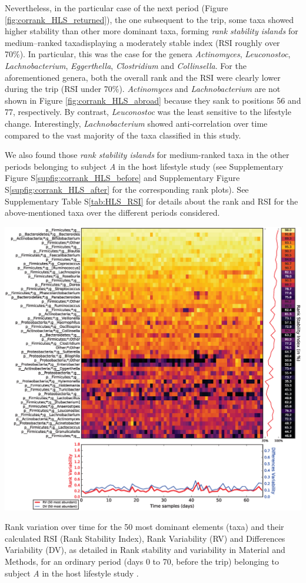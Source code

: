 Nevertheless, in the particular case of the next period (Figure \ref{fig:corrank_HLS_returned}), the one subsequent to the trip, some taxa showed higher stability than other more dominant taxa, forming \emph{rank stability islands} for medium--ranked taxadisplaying a moderately stable index (RSI roughly over 70\%). In particular, this was the case for the genera \emph{Actinomyces}, \emph{Leuconostoc}, \emph{Lachnobacterium}, \emph{Eggerthella}, \emph{Clostridium} and	\emph{Collinsella}. For the aforementioned genera, both the overall rank and the RSI were clearly lower during the trip (RSI under 70\%). \emph{Actinomyces} and \emph{Lachnobacterium} are not shown in Figure \ref{fig:corrank_HLS_abroad} because they sank to positions 56 and 77, respectively. By contrast, \emph{Leuconostoc} was the least sensitive to the lifestyle change. Interestingly, \emph{Lachnobacterium} showed anti-correlation over time compared to the vast majority of the taxa classified in this study.

We also found those \emph{rank stability islands} for medium-ranked taxa in the other periods belonging to subject \emph{A} in the host lifestyle study \cite{hostlife} (see Supplementary Figure S\ref{supfig:corrank_HLS_before} and Supplementary Figure S\ref{supfig:corrank_HLS_after} for the corresponding rank plots). See Supplementary Table S\ref{tab:HLS_RSI} for details about the rank and RSI for the above-mentioned taxa over the different periods considered.

\begin{supfig}
	\centering
	\includegraphics[width=1.0\textwidth]{figs/supfig_corrank_HLS_StoolA_before.eps}
	\caption{Rank variation over time for the 50 most dominant elements (taxa) and their calculated RSI (Rank Stability Index), Rank Variability (RV) and Differences Variability (DV), as detailed in Rank stability and variability in Material and Methods, for an ordinary period (days 0 to 70, before the trip) belonging to subject \emph{A} in the host lifestyle study \cite{hostlife}.}
	\label{supfig:corrank_HLS_before}
\end{supfig}

